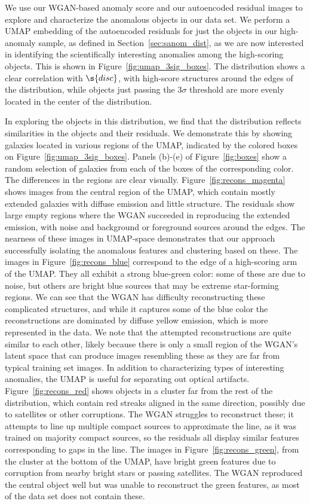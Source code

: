 We use our WGAN-based anomaly score and our autoencoded residual images to explore and characterize the anomalous objects in our data set.
We perform a UMAP embedding of the autoencoded residuals for just the objects in our high-anomaly sample, as defined in Section~\ref{sec:sanom_dist}, as we are now interested in identifying the scientifically interesting anomalies among the high-scoring objects.
This is shown in Figure~\ref{fig:umap_3sig_boxes}.
The distribution shows a clear correlation with $\s{disc}$, with high-score structures around the edges of the distribution, while objects just passing the $3\sigma$ threshold are more evenly located in the center of the distribution.

In exploring the objects in this distribution, we find that the distribution reflects similarities in the objects and their residuals.
We demonstrate this by showing galaxies located in various regions of the UMAP, indicated by the colored boxes on Figure~\ref{fig:umap_3sig_boxes}.
Panels (b)-(e) of Figure~\ref{fig:boxes} show a random selection of galaxies from each of the boxes of the corresponding color.
The differences in the regions are clear visually.
Figure~\ref{fig:recons_magenta} shows images from the central region of the UMAP, which contain mostly extended galaxies with diffuse emission and little structure.
The residuals show large empty regions where the WGAN succeeded in reproducing the extended emission, with noise and background or foreground sources around the edges.
The nearness of these images in UMAP-space demonstrates that our approach successfully isolating the anomalous features and clustering based on these.
The images in Figure~\ref{fig:recons_blue} correspond to the edge of a high-scoring arm of the UMAP.
They all exhibit a strong blue-green color: some of these are due to noise, but others are bright blue sources that may be extreme star-forming regions.
We can see that the WGAN has difficulty reconstructing these complicated structures, and while it captures some of the blue color the reconstructions are dominated by diffuse yellow emission, which is more represented in the data.
We note that the attempted reconstructions are quite similar to each other, likely because there is only a small region of the WGAN's latent space that can produce images resembling these as they are far from typical training set images.
In addition to characterizing types of interesting anomalies, the UMAP is useful for separating out optical artifacts.
Figure~\ref{fig:recons_red} shows objects in a cluster far from the rest of the distribution, which contain red streaks aligned in the same direction, possibly due to satellites or other corruptions.
The WGAN struggles to reconstruct these; it attempts to line up multiple compact sources to approximate the line, as it was trained on majority compact sources, so the residuals all display similar features corresponding to gaps in the line.
The images in Figure~\ref{fig:recons_green}, from the cluster at the bottom of the UMAP, have bright green features due to corruption from nearby bright stars or passing satellites.
The WGAN reproduced the central object well but was unable to reconstruct the green features, as most of the data set does not contain these.

